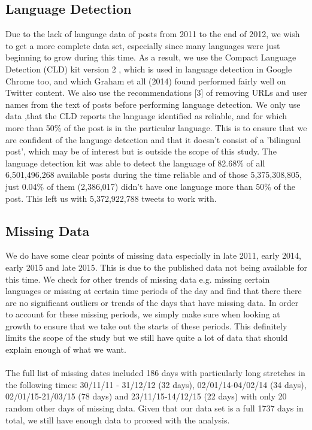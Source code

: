 \documentclass[12pt]{article}
\begin{document}
\subsection{Language Detection}
Due to the lack of language data of posts from 2011 to the end of 2012, we wish to get a more complete data set, especially since many languages were just beginning to grow during this time. As a result, we use the Compact Language Detection (CLD) kit version 2 \cite{CLD}, which is used in language detection in Google Chrome too, and which Graham et all (2014) \cite{Graham} found performed fairly well on Twitter content. We also use the recommendations [3] of removing URLs and user names from the text of posts before performing language detection. We only use data ,that the CLD reports the language identified as reliable, and for which more than 50\% of the post is in the particular language. This is to ensure that we are confident of the language detection and that it doesn't consist of a 'bilingual post', which may be of interest but is outside the scope of this study. The language detection kit was able to detect the language of 82.68\% of all 6,501,496,268 available posts during the time reliable and of those 5,375,308,805, just 0.04\% of them (2,386,017) didn't have one language more than 50\% of the post. This left us with 5,372,922,788 tweets to work with.
\subsection{Missing Data}
We do have some clear points of missing data especially in late 2011, early 2014, early 2015 and late 2015. This is due to the published data not being available for this time. We check for other trends of missing data e.g. missing certain languages or missing at certain time periods of the day and find that there there are no significant outliers or trends of the days that have missing data. In order to account for these missing periods, we simply make sure when looking at growth to ensure that we take out the starts of these periods. This definitely limits the scope of the study but we still have quite a lot of data that should explain enough of what we want.
\\\\
The full list of missing dates included 186 days with particularly long stretches in the following times: 30/11/11 - 31/12/12 (32 days), 02/01/14-04/02/14 (34 days), 02/01/15-21/03/15 (78 days) and 23/11/15-14/12/15 (22 days) with only 20 random other days of missing data. Given that our data set is a full 1737 days in total, we still have enough data to proceed with the analysis.
\newpage
\end{document}
